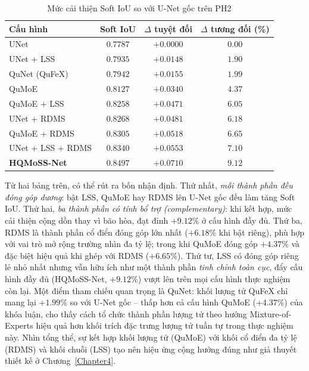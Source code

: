 \begin{table}[h]
\centering
\caption{Mức cải thiện Soft IoU so với U-Net gốc trên PH2}
\label{tab:delta}
\begin{tabular}{|l|c|c|c|}
\hline
\textbf{Cấu hình} & \textbf{Soft IoU} & \textbf{$\Delta$ tuyệt đối} & \textbf{$\Delta$ tương đối (\%)} \\ \hline
UNet              & $0.7787$ & $+0.0000$ & $0.00$ \\ \hline
UNet + LSS        & $0.7935$ & $+0.0148$ & $1.90$ \\ \hline
QuNet (QuFeX)     & $0.7942$ & $+0.0155$ & $1.99$ \\ \hline
QuMoE             & $0.8127$ & $+0.0340$ & $4.37$ \\ \hline
QuMoE + LSS       & $0.8258$ & $+0.0471$ & $6.05$ \\ \hline
UNet + RDMS       & $0.8268$ & $+0.0481$ & $6.18$ \\ \hline
QuMoE + RDMS      & $0.8305$ & $+0.0518$ & $6.65$ \\ \hline
UNet + LSS + RDMS & $0.8340$ & $+0.0553$ & $7.10$ \\ \hline
\textbf{HQMoSS-Net} & $\mathbf{0.8497}$ & $\mathbf{+0.0710}$ & $\mathbf{9.12}$ \\ \hline
\end{tabular}
\end{table}

Từ hai bảng trên, có thể rút ra bốn nhận định. Thứ nhất, \emph{mỗi thành phần đều đóng góp dương}: bật LSS, QuMoE hay RDMS lên U-Net gốc đều làm tăng Soft IoU. Thứ hai, \emph{ba thành phần có tính bổ trợ (complementary)}: khi kết hợp, mức cải thiện cộng dồn thay vì bão hòa, đạt đỉnh $+9.12\%$ ở cấu hình đầy đủ. Thứ ba, RDMS là thành phần cổ điển đóng góp lớn nhất ($+6.18\%$ khi bật riêng), phù hợp với vai trò mở rộng trường nhìn đa tỷ lệ; trong khi QuMoE đóng góp $+4.37\%$ và đặc biệt hiệu quả khi ghép với RDMS ($+6.65\%$). Thứ tư, LSS có đóng góp riêng lẻ nhỏ nhất nhưng vẫn hữu ích như một thành phần \emph{tinh chỉnh toàn cục}, đẩy cấu hình đầy đủ (HQMoSS-Net, $+9.12\%$) vượt lên trên mọi cấu hình thực nghiệm còn lại. Một điểm tham chiếu quan trọng là QuNet: khối lượng tử QuFeX chỉ mang lại $+1.99\%$ so với U-Net gốc -- thấp hơn cả cấu hình QuMoE ($+4.37\%$) của khóa luận, cho thấy cách tổ chức thành phần lượng tử theo hướng Mixture-of-Experts hiệu quả hơn khối trích đặc trưng lượng tử tuần tự trong thực nghiệm này. Nhìn tổng thể, sự kết hợp khối lượng tử (QuMoE) với khối cổ điển đa tỷ lệ (RDMS) và khối chuỗi (LSS) tạo nên hiệu ứng cộng hưởng đúng như giả thuyết thiết kế ở Chương~\ref{Chapter4}.


